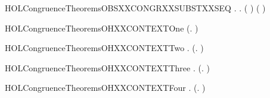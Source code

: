 \newcommand{\HOLCongruenceTheoremsOBSXXCONGRXXSUBSTXXCONTEXT}{\UseVerbatim{HOLCongruenceTheoremsOBSXXCONGRXXSUBSTXXCONTEXT}}
\begin{SaveVerbatim}{HOLCongruenceTheoremsOBSXXCONGRXXSUBSTXXSEQ}
\HOLTokenTurnstile{} \HOLSymConst{\HOLTokenForall{}} .    \HOLSymConst{\HOLTokenImp{}} \HOLSymConst{\HOLTokenForall{}}.   \HOLSymConst{\HOLTokenImp{}}  ( ) ( )
\end{SaveVerbatim}
\newcommand{\HOLCongruenceTheoremsOBSXXCONGRXXSUBSTXXSEQ}{\UseVerbatim{HOLCongruenceTheoremsOBSXXCONGRXXSUBSTXXSEQ}}
\begin{SaveVerbatim}{HOLCongruenceTheoremsOHXXCONTEXTOne}
\HOLTokenTurnstile{}  (\HOLTokenLambda{}. )
\end{SaveVerbatim}
\newcommand{\HOLCongruenceTheoremsOHXXCONTEXTOne}{\UseVerbatim{HOLCongruenceTheoremsOHXXCONTEXTOne}}
\begin{SaveVerbatim}{HOLCongruenceTheoremsOHXXCONTEXTTwo}
\HOLTokenTurnstile{} \HOLSymConst{\HOLTokenForall{}} .   \HOLSymConst{\HOLTokenImp{}}  (\HOLTokenLambda{}.  )
\end{SaveVerbatim}
\newcommand{\HOLCongruenceTheoremsOHXXCONTEXTTwo}{\UseVerbatim{HOLCongruenceTheoremsOHXXCONTEXTTwo}}
\begin{SaveVerbatim}{HOLCongruenceTheoremsOHXXCONTEXTThree}
\HOLTokenTurnstile{} \HOLSymConst{\HOLTokenForall{}} .   \HOLSymConst{\HOLTokenImp{}}  (\HOLTokenLambda{}.   \HOLSymConst{\ensuremath{+}} )
\end{SaveVerbatim}
\newcommand{\HOLCongruenceTheoremsOHXXCONTEXTThree}{\UseVerbatim{HOLCongruenceTheoremsOHXXCONTEXTThree}}
\begin{SaveVerbatim}{HOLCongruenceTheoremsOHXXCONTEXTFour}
\HOLTokenTurnstile{} \HOLSymConst{\HOLTokenForall{}} .   \HOLSymConst{\HOLTokenImp{}}  (\HOLTokenLambda{}.  \HOLSymConst{\ensuremath{+}}  )
\end{SaveVerbatim}
